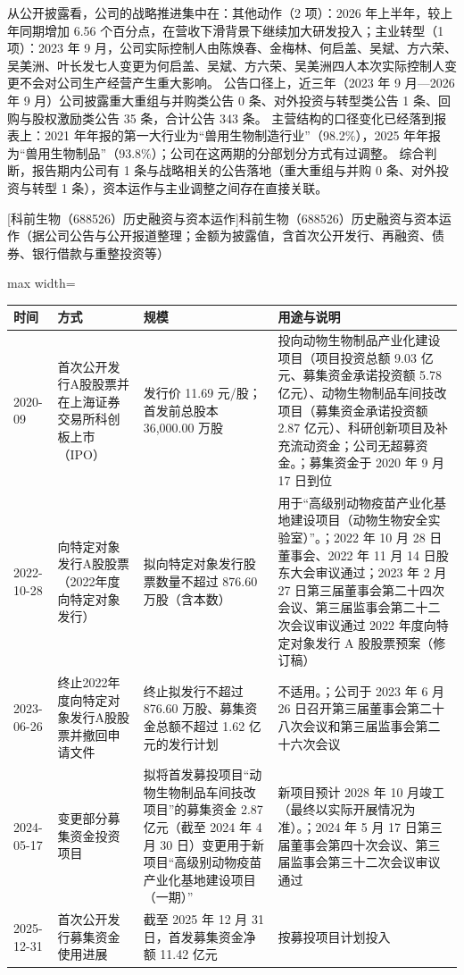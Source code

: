 从公开披露看，公司的战略推进集中在：其他动作（2 项）：2026 年上半年，较上年同期增加 6.56 个百分点，在营收下滑背景下继续加大研发投入；主业转型（1 项）：2023 年 9 月，公司实际控制人由陈焕春、金梅林、何启盖、吴斌、方六荣、吴美洲、叶长发七人变更为何启盖、吴斌、方六荣、吴美洲四人本次实际控制人变更不会对公司生产经营产生重大影响。 公告口径上，近三年（2023 年 9 月---2026 年 9 月）公司披露重大重组与并购类公告 0 条、对外投资与转型类公告 1 条、回购与股权激励类公告 35 条，合计公告 343 条。 主营结构的口径变化已经落到报表上：2021 年年报的第一大行业为“兽用生物制造行业”（98.2\%），2025 年年报为“兽用生物制品”（93.8\%）；公司在这两期的分部划分方式有过调整。 综合判断，报告期内公司有 1 条与战略相关的公告落地（重大重组与并购 0 条、对外投资与转型 1 条），资本运作与主业调整之间存在直接关联。

\begin{center}\small\setlength{\tabcolsep}{4pt}
[科前生物（688526）历史融资与资本运作]{科前生物（688526）历史融资与资本运作（据公司公告与公开报道整理；金额为披露值，含首次公开发行、再融资、债券、银行借款与重整投资等）}
\begin{adjustbox}{max width=\textwidth}
\begin{tabular}{@{}p{1.45cm}p{2.55cm}p{4.05cm}p{4.95cm}@{}}
\toprule
时间 & 方式 & 规模 & 用途与说明 \\
\midrule
2020-09 & 首次公开发行A股股票并在上海证券交易所科创板上市（IPO） & 发行价 11.69 元/\allowbreak{}股；首发前总股本 36,\allowbreak{}000.00 万股 & 投向动物生物制品产业化建设项目（项目投资总额 9.03 亿元、\allowbreak{}募集资金承诺投资额 5.78 亿元）、\allowbreak{}动物生物制品车间技改项目（募集资金承诺投资额 2.87 亿元）、\allowbreak{}科研创新项目及补充流动资金；公司无超募资金。；募集资金于 2020 年 9 月 17 日到位 \\
2022-10-28 & 向特定对象发行A股股票（2022年度向特定对象发行） & 拟向特定对象发行股票数量不超过 876.60 万股（含本数） & 用于“高级别动物疫苗产业化基地建设项目（动物生物安全实验室）”。；2022 年 10 月 28 日董事会、\allowbreak{}2022 年 11 月 14 日股东大会审议通过；2023 年 2 月 27 日第三届董事会第二十四次会议、\allowbreak{}第三届监事会第二十二次会议审议通过 2022 年度向特定对象发行 A 股股票预案（修订稿） \\
2023-06-26 & 终止2022年度向特定对象发行A股股票并撤回申请文件 & 终止拟发行不超过 876.60 万股、\allowbreak{}募集资金总额不超过 1.62 亿元的发行计划 & 不适用。；公司于 2023 年 6 月 26 日召开第三届董事会第二十八次会议和第三届监事会第二十六次会议 \\
2024-05-17 & 变更部分募集资金投资项目 & 拟将首发募投项目“动物生物制品车间技改项目”的募集资金 2.87 亿元（截至 2024 年 4 月 30 日）变更用于新项目“高级别动物疫苗产业化基地建设项目（一期）” & 新项目预计 2028 年 10 月竣工（最终以实际开展情况为准）。；2024 年 5 月 17 日第三届董事会第四十次会议、\allowbreak{}第三届监事会第三十二次会议审议通过 \\
2025-12-31 & 首次公开发行募集资金使用进展 & 截至 2025 年 12 月 31 日，\allowbreak{}首发募集资金净额 11.42 亿元 & 按募投项目计划投入 \\
\bottomrule
\end{tabular}
\end{adjustbox}
\end{center}

